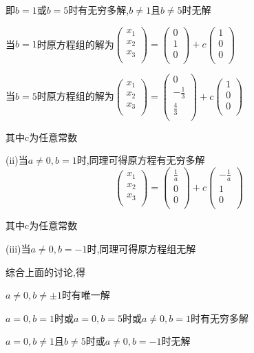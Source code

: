 \documentclass{ctexart}\pagestyle{empty}
\begin{document}
即$b=1$或$b=5$时有无穷多解,$b\neq1$且$b\neq5$时无解

当$b=1$时原方程组的解为$\left(
\begin{array}{c}
x_{1}\\
x_{2}\\
x_{3}\\
\end{array}
\right)=\left(
\begin{array}{c}
0\\
1\\
0\\
\end{array}
\right)+c\left(
\begin{array}{c}
1\\
0\\
0\\
\end{array}
\right)$



当$b=5$时原方程组的解为$\left(
\begin{array}{c}
x_{1}\\
x_{2}\\
x_{3}\\
\end{array}
\right)=\left(
\begin{array}{c}
0\\
-\frac{1}{3}\\
\frac{4}{3}\\
\end{array}
\right)+c\left(
\begin{array}{c}
1\\
0\\
0\\
\end{array}
\right)$

其中c为任意常数


(ii)当$a\neq0,b=1$时,同理可得原方程有无穷多解$$\left(
\begin{array}{c}
x_{1}\\
x_{2}\\
x_{3}\\
\end{array}
\right)=\left(
\begin{array}{c}
\frac{1}{a}\\
0\\
0\\
\end{array}
\right)+c\left(
\begin{array}{c}
-\frac{1}{a}\\
1\\
0\\
\end{array}
\right)$$


其中c为任意常数


(iii)当$a\neq0,b=-1$时,同理可得原方程组无解

综合上面的讨论,得

$a\neq0,b\neq\pm1$时有唯一解

$a=0,b=1$时或$a=0,b=5$时或$a\neq0,b=1$时有无穷多解

$a=0,b\neq1$且$b\neq5$时或$a\neq0,b=-1$时无解
\end{document}
